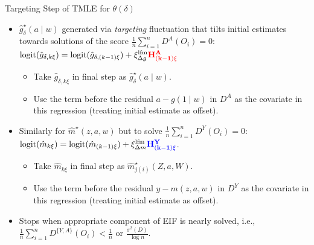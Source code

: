 \documentclass{beamer}
\begin{document}
\begin{frame}[c]{Targeting Step of TMLE for $\theta(\delta)$}

\begin{center}
\begin{itemize}
  \itemsep6pt
  \item $\hat{g}_{\delta}^{\star}(a \mid w)$ generated via \textit{targeting}
    fluctuation that tilts initial estimates towards solutions of the score
    $\frac{1}{n}\sum_{i=1}^n D^A(O_i) = 0$:
    $\text{logit}(\hat{g}_{\delta,k\xi}) =
    \text{logit}(\hat{g}_{\delta,(k-1)\xi}) + \xi_{\Delta g}^{\text{lfm}}
    \mathbf{\textcolor{red}{H^A_{(k-1)\xi}}}$
    \begin{itemize}
      \itemsep4pt
      \item Take $\hat{g}_{\delta,k\xi}$ in final step as
        $\hat{g}_{\delta}^{\star}(a \mid w)$.
      \item Use the term before the residual $a - g(1 \mid w)$ in $D^A$ as the
        covariate in this regression (treating initial estimate as offset).
    \end{itemize}
  \item Similarly for $\hat{m}^{\star}(z,a,w)$ but to solve
    $\frac{1}{n}\sum_{i=1}^n D^Y(O_i) = 0$:
    $\text{logit}(\hat{m}_{k\xi}) = \text{logit}(\hat{m}_{(k-1)\xi}) +
    \xi_{\Delta m}^{\text{lfm}}
    \mathbf{\textcolor{blue}{H^Y_{(k-1)\xi}}}$.
    \begin{itemize}
      \itemsep4pt
      \item Take $\hat{m}_{k\xi}$ in final step as
        $\hat{m}^{\star}_{j(i)}(Z, a, W)$.
      \item Use the term before the residual $y - m(z,a,w)$ in $D^Y$ as the
        covariate in this regression (treating initial estimate as offset).
  \end{itemize}
  \item Stops when appropriate component of EIF is nearly solved, i.e.,
    $\frac{1}{n}\sum_{i=1}^n D^{\{Y, A\}}(O_i) < \frac{1}{n}$ or
    $\frac{\sigma^2(D)}{\log n}$.
\end{itemize}
\end{center}

\note{
}

\end{frame}

\end{document}

